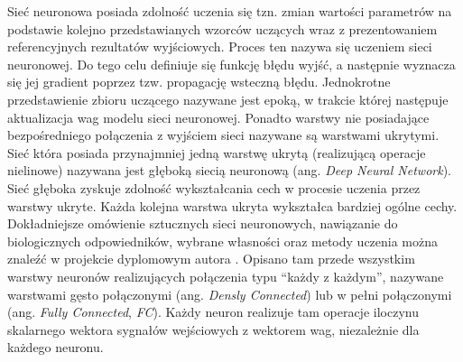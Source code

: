 Sieć neuronowa posiada zdolność uczenia się tzn. zmian wartości parametrów na podstawie kolejno przedstawianych wzorców uczących wraz z prezentowaniem referencyjnych rezultatów wyjściowych.
Proces ten nazywa się uczeniem sieci neuronowej.
Do tego celu definiuje się funkcję błędu wyjść, a następnie wyznacza się jej gradient poprzez tzw. propagację wsteczną błędu.
Jednokrotne przedstawienie zbioru uczącego nazywane jest epoką, w trakcie której następuje aktualizacja wag modelu sieci neuronowej.
Ponadto warstwy nie posiadające bezpośredniego połączenia z wyjściem sieci nazywane są warstwami ukrytymi.
Sieć która posiada przynajmniej jedną warstwę ukrytą (realizującą operacje nielinowe) nazywana jest głęboką siecią neuronową (ang. \emph{Deep Neural Network}).
Sieć głęboka zyskuje zdolność wykształcania cech w procesie uczenia przez warstwy ukryte. 
Każda kolejna warstwa ukryta wykształca bardziej ogólne cechy. 
Dokładniejsze omówienie sztucznych sieci neuronowych, nawiązanie do biologicznych odpowiedników, wybrane własności oraz metody uczenia można znaleźć 
w projekcie dyplomowym autora \cite{inż}. 
Opisano tam przede wszystkim warstwy neuronów realizujących połączenia typu ``każdy z każdym'', nazywane warstwami gęsto połączonymi (ang. \emph{Densly Connected}) lub w pełni połączonymi (ang. \emph{Fully Connected}, \emph{FC}). 
Każdy neuron realizuje tam operacje iloczynu skalarnego wektora sygnałów wejściowych z wektorem wag, niezależnie dla każdego neuronu.

